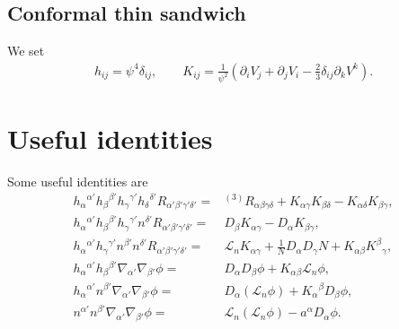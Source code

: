 \documentclass[%
notitlepage,
report,
nofootinbib,
 amsmath,amssymb,
 aps,
]{revtex4-1}
\begin{document}
\subsection{Conformal thin sandwich}
\label{eq:cts}
We set
\begin{align}
   h_{ij}
   =
   \psi^4\delta_{ij}
   ,\qquad
   K_{ij}
   =
   \frac{1}{\psi^2}\left(
      \partial_iV_j
      +
      \partial_jV_i
      -
      \frac{2}{3}\delta_{ij}\partial_kV^k
   \right)
   .
\end{align}
\section{Useful identities}
\label{sec:useful_identities}

Some useful identities are
\begin{subequations}
\begin{align}
   h_{\alpha}{}^{\alpha'}h_{\beta}{}^{\beta'}
   h_{\gamma}{}^{\gamma'}h_{\delta}{}^{\delta'}
   R_{\alpha'\beta'\gamma'\delta'}
   =&
   {}^{(3)}R_{\alpha\beta\gamma\delta}
   +
   K_{\alpha\gamma}K_{\beta\delta}
   -
   K_{\alpha\delta}K_{\beta\gamma}
   ,\\
   h_{\alpha}{}^{\alpha'}h_{\beta}{}^{\beta'}
   h_{\gamma}{}^{\gamma'}n^{\delta'}
   R_{\alpha'\beta'\gamma'\delta'}
   =&
   D_{\beta}K_{\alpha\gamma}
   -
   D_{\alpha}K_{\beta\gamma}
   ,\\
   h_{\alpha}{}^{\alpha'}h_{\gamma}{}^{\gamma'}
   n^{\beta'}n^{\delta'}
   R_{\alpha'\beta'\gamma'\delta'}
   =&
   \mathcal{L}_nK_{\alpha\gamma}
   +
   \frac{1}{N}D_{\alpha}D_{\gamma}N
   +
   K_{\alpha\beta}K^{\beta}{}_{\gamma}
   ,\\
   h_{\alpha}{}^{\alpha'}h_{\beta}{}^{\beta'}
   \nabla_{\alpha'}\nabla_{\beta'}\phi
   =&
   D_{\alpha}D_{\beta}\phi
   +
   K_{\alpha\beta}\mathcal{L}_n\phi
   ,\\
   h_{\alpha}{}^{\alpha'}n^{\beta'}
   \nabla_{\alpha'}\nabla_{\beta'}\phi
   =&
   D_{\alpha}\left(\mathcal{L}_n\phi\right)
   +
   K_{\alpha}{}^{\beta}D_{\beta}\phi
   ,\\
   n^{\alpha'}n^{\beta'}
   \nabla_{\alpha'}\nabla_{\beta'}\phi
   =&
   \mathcal{L}_n\left(\mathcal{L}_n\phi\right)
   -
   a^{\alpha}D_{\alpha}\phi
   .
\end{align}
\end{subequations}
\end{document}
